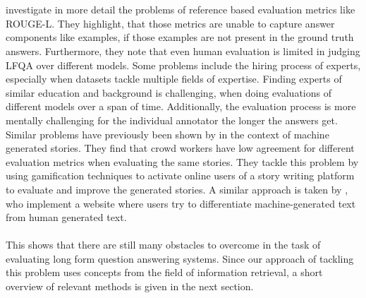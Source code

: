 \\\\
\cite{krishna:2021} investigate in more detail the problems of reference based evaluation metrics like ROUGE-L. 
They highlight, that those metrics are unable to capture answer components like examples, if those examples are not present in the ground truth answers. 
Furthermore, they note that even human evaluation is limited in judging LFQA over different models.
Some problems include the hiring process of experts, especially when datasets tackle multiple fields of expertise.
Finding experts of similar education and background is challenging, when doing evaluations of different models over a span of time.
Additionally, the evaluation process is more mentally challenging for the individual annotator the longer the answers get.
Similar problems have previously been shown by \cite{akoury:2020} in the context of machine generated stories.
They find that crowd workers have low agreement for different evaluation metrics when evaluating the same stories.
They tackle this problem by using gamification techniques to activate online users of a story writing platform to evaluate and improve the generated stories.
A similar approach is taken by \cite{dugan:2020}, who implement a website where users try to differentiate machine-generated text from human generated text.
\\\\
This shows that there are still many obstacles to overcome in the task of evaluating long form question answering systems.
Since our approach of tackling this problem uses concepts from the field of information retrieval, a short overview of relevant methods is given in the next section.

